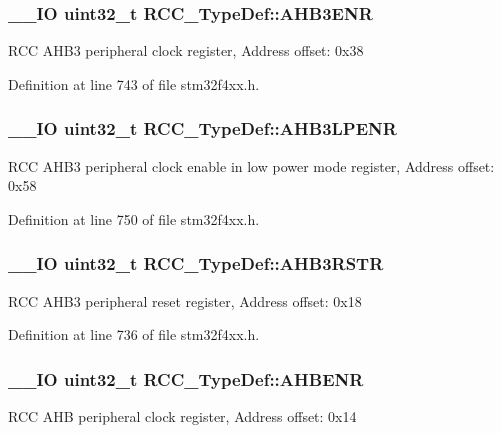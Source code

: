 \hypertarget{struct_r_c_c___type_def_ad4ea7be562b42e2ae1a84db44121195d}{
\subsubsection[{A\-H\-B3\-E\-N\-R}]{\setlength{\rightskip}{0pt plus 5cm}\-\_\-\-\_\-\-I\-O {\bf uint32\-\_\-t} R\-C\-C\-\_\-\-Type\-Def\-::\-A\-H\-B3\-E\-N\-R}}\label{struct_r_c_c___type_def_ad4ea7be562b42e2ae1a84db44121195d}
R\-C\-C A\-H\-B3 peripheral clock register, Address offset\-: 0x38 

Definition at line 743 of file stm32f4xx.\-h.

\hypertarget{struct_r_c_c___type_def_a95edda857c3725bfb410d3a4707edfd8}{
\subsubsection[{A\-H\-B3\-L\-P\-E\-N\-R}]{\setlength{\rightskip}{0pt plus 5cm}\-\_\-\-\_\-\-I\-O {\bf uint32\-\_\-t} R\-C\-C\-\_\-\-Type\-Def\-::\-A\-H\-B3\-L\-P\-E\-N\-R}}\label{struct_r_c_c___type_def_a95edda857c3725bfb410d3a4707edfd8}
R\-C\-C A\-H\-B3 peripheral clock enable in low power mode register, Address offset\-: 0x58 

Definition at line 750 of file stm32f4xx.\-h.

\hypertarget{struct_r_c_c___type_def_a39a90d838fbd0b8515f03e4a1be6374f}{
\subsubsection[{A\-H\-B3\-R\-S\-T\-R}]{\setlength{\rightskip}{0pt plus 5cm}\-\_\-\-\_\-\-I\-O {\bf uint32\-\_\-t} R\-C\-C\-\_\-\-Type\-Def\-::\-A\-H\-B3\-R\-S\-T\-R}}\label{struct_r_c_c___type_def_a39a90d838fbd0b8515f03e4a1be6374f}
R\-C\-C A\-H\-B3 peripheral reset register, Address offset\-: 0x18 

Definition at line 736 of file stm32f4xx.\-h.

\hypertarget{struct_r_c_c___type_def_abaebc9204bbc1708356435a5a01e70eb}{
\subsubsection[{A\-H\-B\-E\-N\-R}]{\setlength{\rightskip}{0pt plus 5cm}\-\_\-\-\_\-\-I\-O {\bf uint32\-\_\-t} R\-C\-C\-\_\-\-Type\-Def\-::\-A\-H\-B\-E\-N\-R}}\label{struct_r_c_c___type_def_abaebc9204bbc1708356435a5a01e70eb}
R\-C\-C A\-H\-B peripheral clock register, Address offset\-: 0x14 


